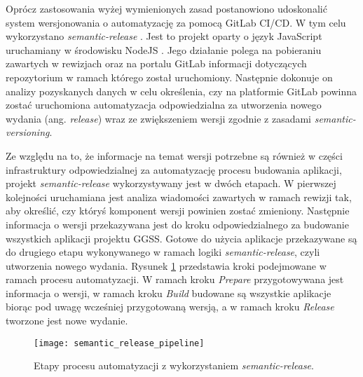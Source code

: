 Oprócz zastosowania wyżej wymienionych zasad postanowiono udoskonalić system wersjonowania o automatyzację za pomocą GitLab CI/CD. W tym celu wykorzystano \emph{semantic-release} \cite{semantic_release}. Jest to projekt oparty o język JavaScript \cite{javascript} uruchamiany w środowisku NodeJS \cite{nodejs}. Jego działanie polega na pobieraniu zawartych w rewizjach oraz na portalu GitLab informacji dotyczących repozytorium w ramach którego został uruchomiony. Następnie dokonuje on analizy pozyskanych danych w celu określenia, czy na platformie GitLab powinna zostać uruchomiona automatyzacja odpowiedzialna za utworzenia nowego wydania (ang. \emph{release}) wraz ze zwiększeniem wersji zgodnie z zasadami \emph{semantic-versioning}.

Ze względu na to, że informacje na temat wersji potrzebne są również w części infrastruktury odpowiedzialnej za automatyzację procesu budowania aplikacji, projekt \emph{semantic-release} wykorzystywany jest w dwóch etapach. W pierwszej kolejności uruchamiana jest analiza wiadomości zawartych w ramach rewizji tak, aby określić, czy któryś komponent wersji powinien zostać zmieniony. Następnie informacja o wersji przekazywana jest do kroku odpowiedzialnego za budowanie wszystkich aplikacji projektu GGSS. Gotowe do użycia aplikacje przekazywane są do drugiego etapu wykonywanego w ramach logiki \emph{semantic-release}, czyli utworzenia nowego wydania. Rysunek \ref{fig:semantic_pipeline} przedstawia kroki podejmowane w ramach procesu automatyzacji. W ramach kroku \emph{Prepare} przygotowywana jest informacja o wersji, w ramach kroku \emph{Build} budowane są wszystkie aplikacje biorąc pod uwagę wcześniej przygotowaną wersją, a w ramach kroku \emph{Release} tworzone jest nowe wydanie.

\begin{figure}[H]
    \centering
    \texttt{[image: semantic\_release\_pipeline]}
    \caption{Etapy procesu automatyzacji z wykorzystaniem \emph{semantic-release}.}
    \label{fig:semantic_pipeline}
\end{figure}

